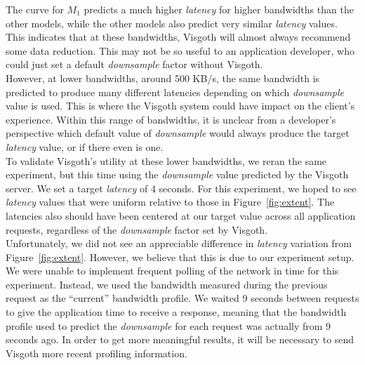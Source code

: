 The curve for $M_1$ predicts a much higher \emph{latency} for higher bandwidths
than the other models, while the other models also predict very similar
\emph{latency} values. This indicates that at these bandwidths, Visgoth will
almost always recommend some data reduction. This may not be so useful to an
application developer, who could just set a default \emph{downsample} factor
without Visgoth. \\

However, at lower bandwidths, around 500 KB/s, the same bandwidth is predicted
to produce many different latencies depending on which \emph{downsample} value
is used. This is where the Visgoth system could have impact on the client's
experience. Within this range of bandwidths, it is unclear from a developer's
perspective which default value of \emph{downsample} would always produce the
target \emph{latency} value, or if there even is one.\\

To validate Visgoth's utility at these lower bandwidths, we reran the same
experiment, but this time using the \emph{downsample} value predicted by the
Visgoth server. We set a target \emph{latency} of 4 seconds. For this
experiment, we hoped to see \emph{latency} values that were uniform relative to
those in Figure~\ref{fig:extent}. The latencies also should have been centered
at our target value across all application requests, regardless of the
\emph{downsample} factor set by Visgoth.\\

Unfortunately, we did not see an appreciable difference in \emph{latency}
variation from Figure~\ref{fig:extent}. However, we believe that this is due to
our experiment setup. We were unable to implement frequent polling of the
network in time for this experiment. Instead, we used the bandwidth measured
during the previous request as the ``current'' bandwidth profile. We waited 9
seconds between requests to give the application time to receive a response,
meaning that the bandwidth profile used to predict the \emph{downsample} for
each request was actually from 9 seconds ago. In order to get more meaningful
results, it will be necessary to send Visgoth more recent profiling
information.

